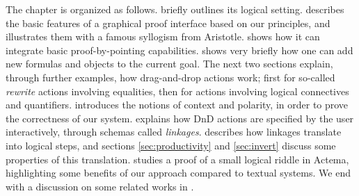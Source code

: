 The chapter is organized as follows.  briefly outlines its
logical setting.  describes the basic features of a graphical
proof interface based on our principles, and illustrates them with a famous
syllogism from Aristotle.  shows how it can integrate basic
proof-by-pointing capabilities.  shows very briefly how one can
add new formulas and objects to the current goal. The next two sections explain,
through further examples, how drag-and-drop actions work; first for
so-called \emph{rewrite} actions involving equalities, then for actions
involving logical connectives and quantifiers.  introduces
the notions of context and polarity, in order to prove the correctness of our
system.  explains how DnD actions are specified by the user
interactively, through schemas called \emph{linkages}.  describes
how linkages translate into logical steps, and sections \ref{sec:productivity}
and \ref{sec:invert} discuss some properties of this translation.
 studies a proof of a small logical riddle in Actema,
highlighting some benefits of our approach compared to textual systems. We end
with a discussion on some related works in .




